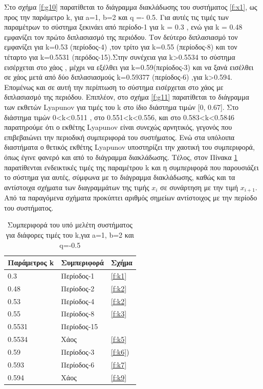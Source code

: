 Στο σχήμα \ref{f:g10} παρατίθεται το διάγραμμα διακλάδωσης του συστήματος \ref{f:x1}, ως προς την παράμετρο k, για a=1, b=2 και q =- 0.5. Για αυτές τις τιμές των παραμέτρων το σύστημα ξεκινάει από περίοδο-1 για k = 0.3 , ενώ για  k = 0.48 εμφανίζει τον πρώτο διπλασιασμό της περιόδου. Τον δεύτερο διπλασιασμό τον εμφανίζει για k=0.53 (περίοδος-4) ,τον τρίτο για k=0.55 (περίοδος-8) και τον τέταρτο για k=0.5531 (περόδος-15).Στην συνέχεια για k>0.5534 το σύστημα εισέρχεται στο χάος , μέχρι να εξέλθει  για k=0.59(περίοδος-3) και να ξανά εισέλθει σε χάος μετά από δύο διπλασιασμούς k=0.59377 (περίοδος-6) ,για k>0.594.
Επομένως και σε αυτή την περίπτωση το σύστημα εισέρχεται στο χάος με διπλασιασμό της περιόδου. 
Επιπλέον, στο σχήμα \ref{f:g11} παρατίθεται το διάγραμμα των εκθετών Lyapunov για τιμές του k στο ίδιο διάστημα τιμών [0, 0.67].  Στο διάστημα τιμών   0<k<0.511 , στο 0.551<k<0.556, και στο 0.583<k<0.5846 παρατηρούμε ότι ο εκθέτης Lyapunov είναι συνεχώς αρνητικός, γεγονός που επιβεβαιώνει την περιοδική συμπεριφορά του συστήματος. Ενώ στα υπόλοιπα διαστήματα ο θετικός εκθέτης Lyapunov υποστηρίζει την χαοτική του συμπεριφορά, όπως έγινε φανερό και από το διάγραμμα διακλάδωσης.
Τέλος, στον Πίνακα \ref{tab:abc2} παρατίθενται ενδεικτικές τιμές της παραμέτρου k και η συμπεριφορά που παρουσιάζει το σύστημα για αυτές, σύμφωνα με το διάγραμμα διακλάδωσης, καθώς και τα αντίστοιχα σχήματα των διαγραμμάτων της τιμής \(x_i\) σε συνάρτηση με την τιμή \(x_{i+1}\). Από τα παραγόμενα σχήματα προκύπτει αριθμός σημείων αντίστοιχος με την περίοδο του συστήματος.

\begin{table}[h!]
	\centering
	\begin{tabular}{l | l | l}
		Παράμετρος k & Συμπεριφορά & Σχήμα\\
		\hline
		0.3 &  Περίοδος-1 & \ref{f:k1}\\
		0.48& Περίοδος-2 & \ref{f:k2}\\
		0.53& Περίοδος-4 & \ref{f:k2}\\
		0.55 &  Περίοδος-8 & \ref{f:k3}\\
		0.5531 & Περίοδος-15 & \ \\
		0.5534 & Χάος & \ref{f:k5}\\
		0.59 & Περίοδος-3 & \ref{f:k6})\\
		0.593 & Περίοδος-6 & \ref{f:k7}\\
		0.594 & Χάος & \ref{f:k9}\\
	\end{tabular}
	\caption{ Συμπεριφορά του υπό μελέτη συστήματος για διάφορες τιμές του k,για a=1, b=2 και q=-0.5}
	\label{tab:abc2}
\end{table}

